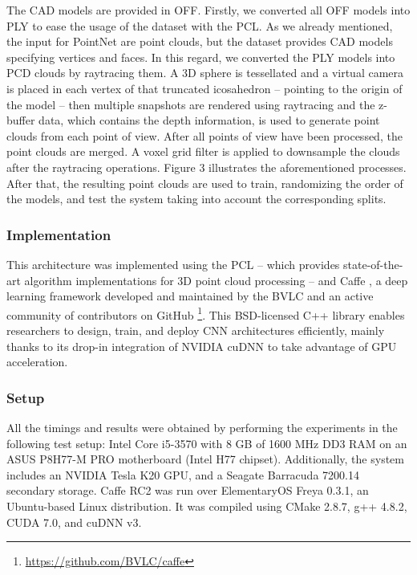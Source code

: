The CAD models are provided in \ac{OFF}. Firstly, we converted all \ac{OFF} models into \ac{PLY} to ease the usage of the dataset with the \ac{PCL}. As we already mentioned, the input for PointNet are point clouds, but the dataset provides \ac{CAD} models specifying vertices and faces. In this regard, we converted the PLY models into \ac{PCD} clouds by raytracing them. A 3D sphere is tessellated and a virtual camera is placed in each vertex of that truncated icosahedron – pointing to the origin of the model – then multiple snapshots are rendered using raytracing and the z-buffer data, which contains the depth information, is used to generate point clouds from each point of view. After all points of view have been processed, the point clouds are merged. A voxel grid filter is applied to downsample the clouds after the raytracing operations. Figure 3 illustrates the aforementioned processes. After that, the resulting point clouds are used to train, randomizing the order of the models, and test the system taking into account the corresponding splits.

\subsubsection{Implementation}

This architecture was implemented using the \ac{PCL} \cite{Rusu2011}\cite{Aldoma2012} – which provides state-of-the-art algorithm implementations for 3D point cloud processing – and Caffe \cite{Jia2014}, a deep learning framework developed and maintained by the \ac{BVLC} and an active community of contributors on GitHub \footnote{\url{https://github.com/BVLC/caffe}}. This BSD-licensed C++ library enables researchers to design, train, and deploy \ac{CNN} architectures efficiently, mainly thanks to its drop-in integration of NVIDIA cuDNN \cite{Chetlur2014} to take advantage of \ac{GPU} acceleration.


\subsubsection{Setup}

All the timings and results were obtained by performing the experiments in the following test setup: Intel Core i5-3570 with 8 GB of 1600 MHz DD3 RAM on an ASUS P8H77-M PRO motherboard (Intel H77 chipset). Additionally, the system includes an NVIDIA Tesla K20 GPU, and a Seagate Barracuda 7200.14 secondary storage. Caffe RC2 was run over ElementaryOS Freya 0.3.1, an Ubuntu-based Linux distribution. It was compiled using CMake 2.8.7, g++ 4.8.2, CUDA 7.0, and cuDNN v3.


